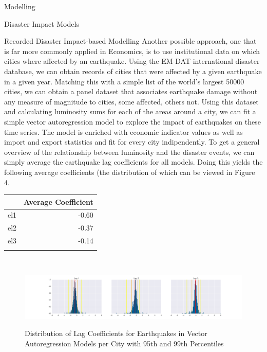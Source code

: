 \documentclass[12.5pt,fleqn,leqno,letterpaper]{article}
\begin{document}
\begin{section}{Modelling}
\begin{subsection}{Disaster Impact Models}
    \begin{subsubsection}{Recorded Disaster Impact-based Modelling}
      Another possible approach, one that is far more commonly applied in Economics, is to use institutional data on which cities where affected by an earthquake. Using the EM-DAT international disaster database, we can obtain records of cities that were affected by a given earthquake in a given year. Matching this with a simple list of the world's largest 50000 cities, we can obtain a panel dataset that associates earthquake damage without any measure of magnitude to cities, some affected, others not.
      Using this dataset and calculating luminosity sums for each of the areas around a city, we can fit a simple vector autoregression model to explore the impact of earthquakes on these time series. The model is enriched with economic indicator values as well as import and export statistics and fit for every city indipendently. To get a general overview of the relationship between luminosity and the disaster events, we can simply average the earthquake lag coefficients for all models. Doing this yields the following average coefficients (the distribution of which can be viewed in Figure 4.\\
      \begin{center}
        \begin{tabular}{lr}\\
          \toprule
          {} & Average Coefficient \\
          \midrule
          el1 & -0.60 \\
          el2 & -0.37 \\
          el3 & -0.14 \\
          \bottomrule\\
        \end{tabular}\\
      \end{center}
      \begin{figure}
        \centering
        \includegraphics[width=\linewidth]{non_balanced_earthquake_coefficients_distribution}\label{fig:non_balanced_earthquake_coefficients_distribution}
        \caption{Distribution of Lag Coefficients for Earthquakes in Vector Autoregression Models per City with 95th and 99th Percentiles}

\end{figure}
\end{subsubsection}
\end{subsection}
\end{section}
\end{document}
